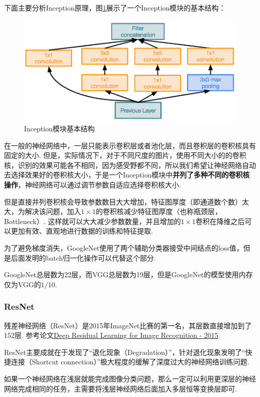 \documentclass[12pt, a4paper, oneside]{ctexart}
\numberwithin{equation}{section}  %
\begin{document}
下面主要分析Inception原理，图\ref{fig-Inception}展示了一个Inception模块的基本结构：
\begin{figure}[htbp]
  \centering
  \includegraphics[scale=0.3]{Inception.png}
  \caption{Inception模块基本结构}
  \label{fig-Inception}
\end{figure}

在一般的神经网络中，一层只能表示卷积层或者池化层，而且卷积层的卷积核具有固定的大小. 但是，实际情况下，对于不同尺度的图片，使用不同大小的的卷积核，识别的效果可能各不相同，因为感受野都不同，所以我们希望让神经网络自动去选择效果好的卷积核大小，于是一个Inception模块中\textbf{并列了多种不同的卷积核操作}，神经网络可以通过调节参数自适应选择卷积核大小.

但是直接并列卷积核会导致参数数目大大增加，特征图厚度（即通道数个数）太大，为解决该问题，加入$1\times 1$的卷积核减少特征图厚度（也称瓶颈层，Bottleneck）. 这样就可以大大减少参数数量，并且增加的$1\times 1$卷积在降维之后可以更加有效、直观地进行数据的训练和特征提取.

为了避免梯度消失，GoogleNet使用了两个辅助分类器接受中间结点的loss值，但是后面发明的batch归一化操作可以代替这个部分.

GoogleNet总层数为22层，而VGG总层数为19层，但是GoogleNet的模型使用内存仅为VGG的$1/10$.

\subsubsection{ResNet}

残差神经网络（ResNet）是2015年ImageNet比赛的第一名，其层数直接增加到了152层. 参考论文\href{https://arxiv.org/pdf/1512.03385.pdf}{Deep Residual Learning for Image Recognition - 2015}.

ResNet主要成就在于发现了“退化现象（Degradation）”，针对退化现象发明了“快捷连接（Shortcut connection）”极大程度的缓解了深度过大的神经网络训练问题.

如果一个神经网络在浅层就能完成图像分类问题，那么一定可以利用更深层的神经网络完成相同的任务，主需要将浅层神经网络后面加入多层恒等变换层即可.
\end{document}
